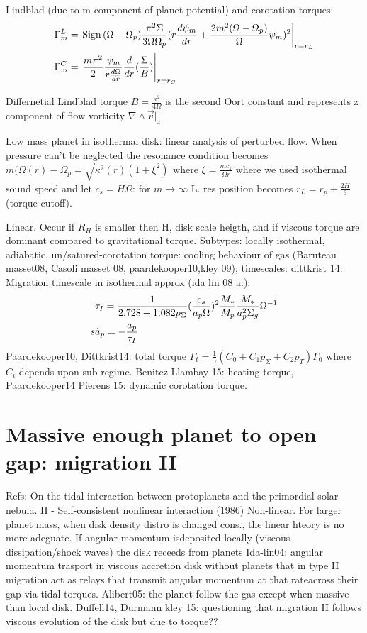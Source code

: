 Lindblad (due to m-component of planet potential) and corotation torques:
\begin{align*}
&\Gamma_m^L=\left.\sign{(\Omega-\Omega_p)}\frac{\pi^2\Sigma}{3\Omega\Omega_p}(r\TDy{r}{\psi_m}+\frac{2m^2(\Omega-\Omega_p)}{\Omega}\psi_m)^2\right|_{r=r_L}\\
&\Gamma_m^C=\left.\frac{m\pi^2}{2}\frac{\psi_m}{r\TDy{r}{\Omega}}\TDof{r}(\frac{\Sigma}{B})\right|_{r=r_C}
\end{align*}

Differnetial Lindblad torque
$B=\frac{\kappa^2}{4\Omega}$ is the second Oort constant and represents z component of flow vorticity $\nabla\wedge\vec{v}|_z$

\begin{workout}
Low mass planet in isothermal disk: linear analysis of perturbed flow.
When pressure can't be neglected the resonance condition becomes $m(\Omega(r)-\Omega_p=\sqrt{\kappa^2(r)(1+\xi^2)}$ where $\xi=\frac{mc_s}{\Omega r}$ where we used isothermal sound speed and let $c_s=H\Omega$: for $m\to\infty$ L. res position becomes $r_L=r_p+\frac{2H}{3}$ (torque cutoff).

Linear. Occur if $R_H$ is smaller then H, disk scale heigth, and if viscous torque are dominant compared to gravitational torque.
Subtypes: locally isothermal, adiabatic, un/satured-corotation torque: cooling behaviour of gas (Baruteau masset08, Casoli masset 08, paardekooper10,kley 09); timescales: dittkrist 14.
Migration timescale in isothermal approx (ida lin 08 a:):
\begin{align*}
&\tau_I=\frac{1}{2.728+1.082p_{\Sigma}}(\frac{c_s}{a_p\Omega})^2\frac{M_*}{M_p}\frac{M_*}{a_p^2\Sigma_g}\Omega\expy{-1}\\
s&\dot{a}_p=-\frac{a_p}{\tau_I}
\end{align*}
Paardekooper10, Dittkrist14: total torque $\Gamma_t=\frac{1}{\gamma}(C_0+C_1p_{\Sigma}+C_2p_T)\Gamma_0$ where $C_i$ depends upon sub-regime.
Benitez Llambay 15: heating torque, Paardekooper14 Pierens 15: dynamic corotation torque.
\end{workout}

\section{Massive enough planet to open gap: migration II}

Refs: On the tidal interaction between protoplanets and the primordial solar nebula. II - Self-consistent nonlinear interaction (1986)
Non-linear. For larger planet mass, when disk density distro is changed cons., the linear hteory is no more adeguate. If angular momentum isdeposited locally (viscous dissipation/shock waves)  the disk receeds from planets
Ida-lin04: angular momentum trasport in viscous accretion disk without planets that in type II migration act as relays that transmit angular momentum at that rateacross their gap via tidal torques.
Alibert05: the planet follow the gas except when massive than local disk.
Duffell14, Durmann kley 15: questioning that migration II follows viscous evolution of the disk but due to torque??


